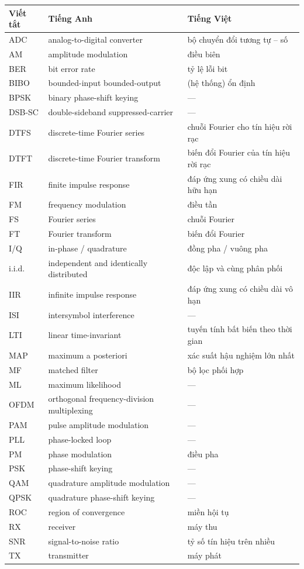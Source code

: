 \documentclass[
  10
]{article}
\newcounter{none} %
\begin{document}
{\def\LTcaptype{none} %
\begin{longtable}[]{@{}|l|l|l|@{}}
\toprule\noalign{}
\endhead
\bottomrule\noalign{}
\endlastfoot
\hline
Viết tắt & Tiếng Anh & Tiếng Việt \\
\hline
ADC & analog-to-digital converter & bộ chuyển đổi tương tự -- số \\
\hline
AM & amplitude modulation & điều biên \\
\hline
BER & bit error rate & tỷ lệ lỗi bit \\
\hline
BIBO & bounded-input bounded-output & (hệ thống) ổn định \\
\hline
BPSK & binary phase-shift keying & --- \\
\hline
DSB-SC & double-sideband suppressed-carrier & --- \\
\hline
DTFS & discrete-time Fourier series & chuỗi Fourier cho tín hiệu rời
rạc \\
\hline
DTFT & discrete-time Fourier transform & biến đổi Fourier của tín hiệu
rời rạc \\
\hline
FIR & finite impulse response & đáp ứng xung có chiều dài hữu hạn \\
\hline
FM & frequency modulation & điều tần \\
\hline
FS & Fourier series & chuỗi Fourier \\
\hline
FT & Fourier transform & biến đổi Fourier \\
\hline
I/Q & in-phase / quadrature & đồng pha / vuông pha \\
\hline
i.i.d. & independent and identically distributed & độc lập và cùng phân
phối \\
\hline
IIR & infinite impulse response & đáp ứng xung có chiều dài vô hạn \\
\hline
ISI & intersymbol interference & --- \\
\hline
LTI & linear time-invariant & tuyến tính bất biến theo thời gian \\
\hline
MAP & maximum a posteriori & xác suất hậu nghiệm lớn nhất \\
\hline
MF & matched filter & bộ lọc phối hợp \\
\hline
ML & maximum likelihood & --- \\
\hline
OFDM & orthogonal frequency-division multiplexing & --- \\
\hline
PAM & pulse amplitude modulation & --- \\
\hline
PLL & phase-locked loop & --- \\
\hline
PM & phase modulation & điều pha \\
\hline
PSK & phase-shift keying & --- \\
\hline
QAM & quadrature amplitude modulation & --- \\
\hline
QPSK & quadrature phase-shift keying & --- \\
\hline
ROC & region of convergence & miền hội tụ \\
\hline
RX & receiver & máy thu \\
\hline
SNR & signal-to-noise ratio & tỷ số tín hiệu trên nhiều \\
\hline
TX & transmitter & máy phát \\
\hline
\end{longtable}
}
\end{document}
